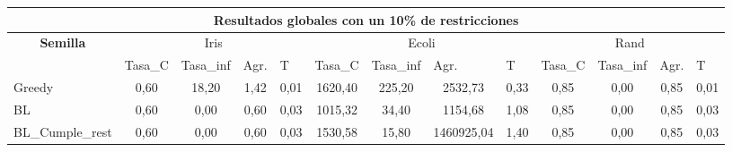 \documentclass[12pt, spanish]{article}
\begin{document}
\begin{table}[H]
\small
\begin{adjustwidth}{-2cm}{-2cm}%


\begin{tabular}{|l|c|c|c|c|c|c|c|c|c|c|c|c|}
\hline
\multicolumn{13}{|c|}{\textbf{Resultados globales con un 10\% de restricciones}}                                                                                                                                                                                                                                                                                                                                       \\ \hline
\multicolumn{1}{|c|}{\multirow{2}{*}{\textbf{Semilla}}} & \multicolumn{4}{c|}{Iris}                                                                                          & \multicolumn{4}{c|}{Ecoli}                                                                                         & \multicolumn{4}{c|}{Rand}                                                                                          \\ \cline{2-13} 
\multicolumn{1}{|c|}{}                                  & \multicolumn{1}{l|}{Tasa\_C} & \multicolumn{1}{l|}{Tasa\_inf} & \multicolumn{1}{l|}{Agr.} & \multicolumn{1}{l|}{T} & \multicolumn{1}{l|}{Tasa\_C} & \multicolumn{1}{l|}{Tasa\_inf} & \multicolumn{1}{l|}{Agr.} & \multicolumn{1}{l|}{T} & \multicolumn{1}{l|}{Tasa\_C} & \multicolumn{1}{l|}{Tasa\_inf} & \multicolumn{1}{l|}{Agr.} & \multicolumn{1}{l|}{T} \\ \hline
Greedy                                                  & 0,60                         & 18,20                          & 1,42                      & 0,01                   & 1620,40                      & 225,20                         & 2532,73                   & 0,33                   & 0,85                         & 0,00                           & 0,85                      & 0,01                   \\ \hline
BL                                                      & 0,60                         & 0,00                           & 0,60                      & 0,03                   & 1015,32                      & 34,40                          & 1154,68                   & 1,08                   & 0,85                         & 0,00                           & 0,85                      & 0,03                   \\ \hline
BL\_Cumple\_rest                                        & 0,60                         & 0,00                           & 0,60                      & 0,03                   & 1530,58                      & 15,80                          & 1460925,04                & 1,40                   & 0,85                         & 0,00                           & 0,85                      & 0,03                   \\ \hline

\end{tabular}
\end{adjustwidth}
\end{table}
\end{document}
